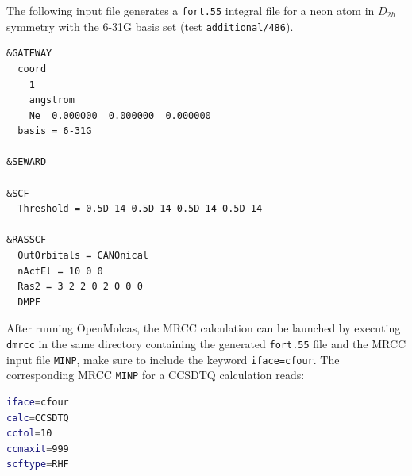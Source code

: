 \documentclass[journal=jctcce,a4paper]{achemso}
\begin{document}
{

The following input file generates a \texttt{fort.55} integral file for a neon atom in $D_{2h}$ symmetry with the 
6-31G basis set (test \texttt{additional/486}).

\begin{lstlisting}[language=OpenMolcas,caption={OpenMolcas input for generating a \texttt{fort.55} file.},label=lst:mrcc-inp]
&GATEWAY
  coord
    1
    angstrom
    Ne  0.000000  0.000000  0.000000
  basis = 6-31G

&SEWARD

&SCF
  Threshold = 0.5D-14 0.5D-14 0.5D-14 0.5D-14

&RASSCF
  OutOrbitals = CANOnical
  nActEl = 10 0 0
  Ras2 = 3 2 2 0 2 0 0 0
  DMPF
\end{lstlisting}

After running OpenMolcas, the MRCC calculation can be launched by executing \texttt{dmrcc} in the same directory 
containing the generated \texttt{fort.55} file and the MRCC input file \texttt{MINP}, make sure to include the 
keyword \texttt{iface=cfour}. The corresponding MRCC \texttt{MINP} for a CCSDTQ calculation reads:

\begin{lstlisting}[language=bash,caption={MRCC \texttt{MINP} input file.},label=lst:mrcc-minp]
iface=cfour
calc=CCSDTQ
cctol=10
ccmaxit=999
scftype=RHF
\end{lstlisting}

}



\end{document}
